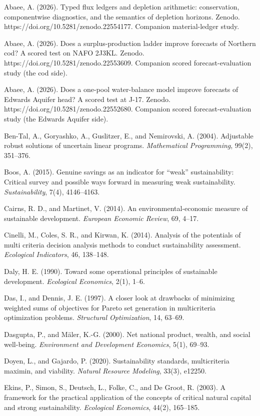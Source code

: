 \documentclass[11pt]{article}
\begin{document}
Abaee, A. (2026). Typed flux ledgers and depletion arithmetic:
conservation, componentwise diagnostics, and the semantics of depletion
horizons. Zenodo. https://doi.org/10.5281/zenodo.22554177. Companion
material-ledger study.

Abaee, A. (2026). Does a surplus-production ladder improve forecasts of
Northern cod? A scored test on NAFO 2J3KL. Zenodo.
https://doi.org/10.5281/zenodo.22553609. Companion scored
forecast-evaluation study (the cod side).

Abaee, A. (2026). Does a one-pool water-balance model improve forecasts
of Edwards Aquifer head? A scored test at J-17. Zenodo.
https://doi.org/10.5281/zenodo.22552680. Companion scored
forecast-evaluation study (the Edwards Aquifer side).

Ben-Tal, A., Goryashko, A., Guslitzer, E., and Nemirovski, A. (2004).
Adjustable robust solutions of uncertain linear programs.
\emph{Mathematical Programming}, 99(2), 351--376.

Boos, A. (2015). Genuine savings as an indicator for ``weak''
sustainability: Critical survey and possible ways forward in measuring
weak sustainability. \emph{Sustainability}, 7(4), 4146--4163.

Cairns, R. D., and Martinet, V. (2014). An environmental-economic
measure of sustainable development. \emph{European Economic Review}, 69,
4--17.

Cinelli, M., Coles, S. R., and Kirwan, K. (2014). Analysis of the
potentials of multi criteria decision analysis methods to conduct
sustainability assessment. \emph{Ecological Indicators}, 46, 138--148.

Daly, H. E. (1990). Toward some operational principles of sustainable
development. \emph{Ecological Economics}, 2(1), 1--6.

Das, I., and Dennis, J. E. (1997). A closer look at drawbacks of
minimizing weighted sums of objectives for Pareto set generation in
multicriteria optimization problems. \emph{Structural Optimization}, 14,
63--69.

Dasgupta, P., and M\"aler, K.-G. (2000). Net national product, wealth, and
social well-being. \emph{Environment and Development Economics}, 5(1),
69--93.

Doyen, L., and Gajardo, P. (2020). Sustainability standards,
multicriteria maximin, and viability. \emph{Natural Resource Modeling},
33(3), e12250.

Ekins, P., Simon, S., Deutsch, L., Folke, C., and De Groot, R. (2003). A
framework for the practical application of the concepts of critical
natural capital and strong sustainability. \emph{Ecological Economics},
44(2), 165--185.
\end{document}

